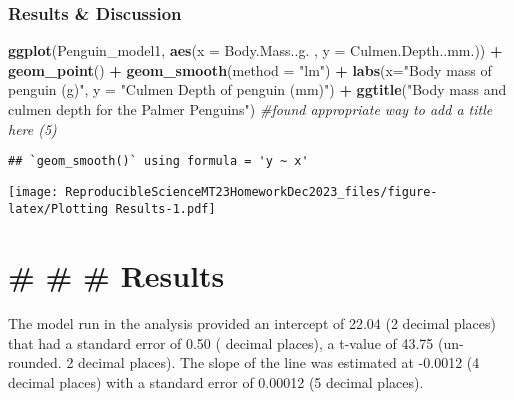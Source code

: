 \documentclass[
]{article}
\newenvironment{Shaded}{\begin{snugshade}}{\end{snugshade}}
\newcommand{\AttributeTok}[1]{\textcolor[rgb]{0.13,0.29,0.53}{#1}}
\newcommand{\CommentTok}[1]{\textcolor[rgb]{0.56,0.35,0.01}{\textit{#1}}}
\newcommand{\FunctionTok}[1]{\textcolor[rgb]{0.13,0.29,0.53}{\textbf{#1}}}
\newcommand{\NormalTok}[1]{#1}
\newcommand{\SpecialCharTok}[1]{\textcolor[rgb]{0.81,0.36,0.00}{\textbf{#1}}}
\newcommand{\StringTok}[1]{\textcolor[rgb]{0.31,0.60,0.02}{#1}}
\begin{document}
\hypertarget{results-discussion}{%
\subsubsection{Results \& Discussion}\label{results-discussion}}

\begin{Shaded}
\begin{Highlighting}[]
\FunctionTok{ggplot}\NormalTok{(Penguin\_model1, }\FunctionTok{aes}\NormalTok{(}\AttributeTok{x =}\NormalTok{ Body.Mass..g. , }\AttributeTok{y =}\NormalTok{ Culmen.Depth..mm.)) }\SpecialCharTok{+}
  \FunctionTok{geom\_point}\NormalTok{() }\SpecialCharTok{+}
  \FunctionTok{geom\_smooth}\NormalTok{(}\AttributeTok{method =} \StringTok{"lm"}\NormalTok{) }\SpecialCharTok{+}
  \FunctionTok{labs}\NormalTok{(}\AttributeTok{x=}\StringTok{"Body mass of penguin (g)"}\NormalTok{, }\AttributeTok{y =} \StringTok{"Culmen Depth of penguin (mm)"}\NormalTok{) }\SpecialCharTok{+}
  \FunctionTok{ggtitle}\NormalTok{(}\StringTok{"Body mass and culmen depth for the Palmer Penguins"}\NormalTok{)  }\CommentTok{\#found appropriate way to add a title here (5)}
\end{Highlighting}
\end{Shaded}

\begin{verbatim}
## `geom_smooth()` using formula = 'y ~ x'
\end{verbatim}

\texttt{[image: ReproducibleScienceMT23HomeworkDec2023\_files/figure-latex/Plotting Results-1.pdf]}

\begin{Shaded}
\end{Shaded}

\hypertarget{results}{%
\section{\# \# \# Results}\label{results}}

The model run in the analysis provided an intercept of 22.04 (2 decimal
places) that had a standard error of 0.50 ( decimal places), a t-value
of 43.75 (un-rounded. 2 decimal places). The slope of the line was
estimated at -0.0012 (4 decimal places) with a standard error of 0.00012
(5 decimal places).
\end{document}
